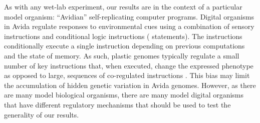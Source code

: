 As with any wet-lab experiment, our results are in the context of a particular model organism: ``Avidian'' self-replicating computer programs.
Digital organisms in Avida regulate responses to environmental cues using a combination of sensory instructions and conditional logic instructions ( statements).
The  instructions conditionally execute a single instruction depending on previous computations and the state of memory.  
As such, plastic genomes typically regulate a small number of key instructions that, when executed, change the expressed phenotype as opposed to large, sequences of co-regulated instructions \citep{consequences_of_plasticity_supplemental_material_2021}.
This bias may limit the accumulation of hidden genetic variation in Avida genomes. 
However, as there are many model biological organisms, there are many model digital organisms that have different regulatory mechanisms that should be used to test the generality of our results.



